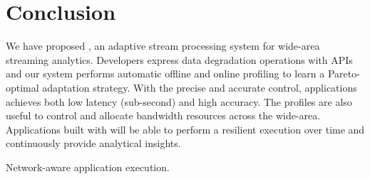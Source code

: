 \section{Conclusion}
\label{sec:conclusion}

We have proposed \sysname{}, an adaptive stream processing system for wide-area
streaming analytics. Developers express data degradation operations with
\maybe{} APIs and our system performs automatic offline and online profiling to
learn a Pareto-optimal adaptation strategy. With the precise and accurate
control, \sysname{} applications achieves both low latency (sub-second) and high
accuracy. The profiles are also useful to control and allocate bandwidth
resources across the wide-area. Applications built with \sysname{} will be able
to perform a resilient execution over time and continuously provide analytical
insights.

Network-aware application execution.

